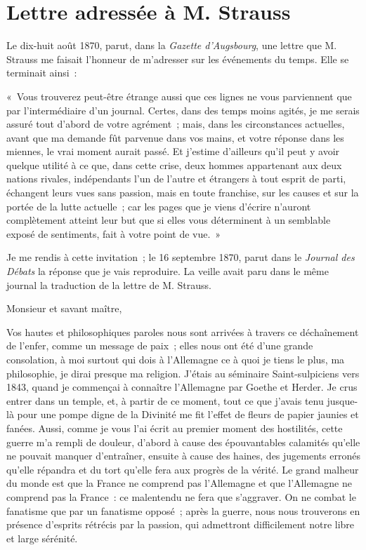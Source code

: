 \documentclass[french,twoside]{book} %
\newcommand{\dateline}[1]{\medskip{\RaggedLeft{#1}\par}\bigskip}
\begin{document}
\section[{Lettre adressée à M. Strauss}]{Lettre adressée à M. Strauss}\renewcommand{\leftmark}{Lettre adressée à M. Strauss}


\dateline{Le 13 septembre 1870}
\noindent Le dix-huit août 1870, parut, dans la {\itshape Gazette d’Augsbourg}, une lettre que M. Strauss me faisait l’honneur de m’adresser sur les événements du temps. Elle se terminait ainsi :\par
« Vous trouverez peut-être étrange aussi que ces lignes ne vous parviennent que par l’intermédiaire d’un journal. Certes, dans des temps moins agités, je me serais assuré tout d’abord de votre agrément ; mais, dans les circonstances actuelles, avant que ma demande fût parvenue dans vos mains, et votre réponse dans les miennes, le vrai moment aurait passé. Et j’estime d’ailleurs qu’il peut y avoir quelque utilité à ce que, dans cette crise, deux hommes appartenant aux deux nations rivales, indépendants l’un de l’autre et étrangers à tout esprit de parti, échangent leurs vues sans passion, mais en toute franchise, sur les causes et sur la portée de la lutte actuelle ; car les pages que je viens d’écrire n’auront complètement atteint leur but que si elles vous déterminent à un semblable exposé de sentiments, fait à votre point de vue. »\par
Je me rendis à cette invitation ; le 16 septembre 1870, parut dans le {\itshape Journal des Débats} la réponse que je vais reproduire. La veille avait paru dans le même journal la traduction de la lettre de M. Strauss.\par
Monsieur et savant maître,\par
Vos hautes et philosophiques paroles nous sont arrivées à travers ce déchaînement de l’enfer, comme un message de paix ; elles nous ont été d’une grande consolation, à moi surtout qui dois à l’Allemagne ce à quoi je tiens le plus, ma philosophie, je dirai presque ma religion. J’étais au séminaire Saint-sulpiciens vers 1843, quand je commençai à connaître l’Allemagne par Goethe et Herder. Je crus entrer dans un temple, et, à partir de ce moment, tout ce que j’avais tenu jusque-là pour une pompe digne de la Divinité me fit l’effet de fleurs de papier jaunies et fanées. Aussi, comme je vous l’ai écrit au premier moment des hostilités, cette guerre m’a rempli de douleur, d’abord à cause des épouvantables calamités qu’elle ne pouvait manquer d’entraîner, ensuite à cause des haines, des jugements erronés qu’elle répandra et du tort qu’elle fera aux progrès de la vérité. Le grand malheur du monde est que la France ne comprend pas l’Allemagne et que l’Allemagne ne comprend pas la France : ce malentendu ne fera que s’aggraver. On ne combat le fanatisme que par un fanatisme opposé ; après la guerre, nous nous trouverons en présence d’esprits rétrécis par la passion, qui admettront difficilement notre libre et large sérénité.\par
\end{document}
